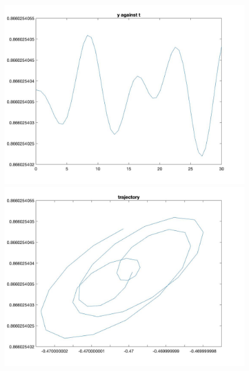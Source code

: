 \documentclass[11pt]{article}
\begin{document}
\begin{figure}[H]
\includegraphics[width = 12cm, height = 8cm]{Q5(20).jpg}
\includegraphics[width = 12cm, height = 8cm]{Q5(21).jpg}
\end{figure}
\end{document}
